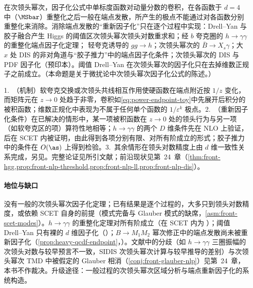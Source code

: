 \begin{proposition}\label{prop:power-nlp-endpoint}
在次领头幂次，因子化公式中单标度函数对动量分数的卷积，在各函数于 $d=4$ 中（$\MSbar$）重整化之后一般在端点发散，所产生的极点不能通过对各函数分别重整化来消除。消除端点发散的“重新因子化”只在逐个过程中实现：Drell--Yan 与胶子融合产生 Higgs 的阈值区次领头幂次领头对数重求和\cite{Beneke:2018gvs,Beneke:2019mua}；经 $b$ 夸克圈的 $h\to\gamma\gamma$ 的重整化端点因子化定理\cite{Liu:2019oav,Liu:2020wbn}；%
轻夸克诱导的 $gg\to h$\cite{Liu:2022ajh}；次领头幂次的 $\bar B\to X_s\gamma$\cite{Hurth:2023paz}；大 $x$ 处 DIS 的非对角道\cite{Beneke:2020ibj}与“胶子推力”中的端点因子化条件\cite{Beneke:2022obx}；次领头幂次的 DIS 与 PDF 因子化\cite{Beneke:2026miy}（预印本）。阈值 Drell--Yan 在次领头幂次的因子化只在去掉维数正规子之前成立\cite{Beneke:2019oqx}。（本命题是关于微扰论中次领头幂次因子化公式的陈述。）
\end{proposition}

\begin{proofsketch}
1.~（机制）软夸克交换或次领头共线相互作用使硬函数在端点附近按 $1/z$ 变化，而矩阵元在 $z\to0$ 处趋于非零，卷积如\eqref{eq:power-endpoint-toy}中先展开后积分的被积函数；维数正规化中表现为不属于任何单个函数的 $1/\varepsilon^k$ 极点\cite{Liu:2019oav,Beneke:2019oqx}。2.~（重新因子化条件）在已解决的情形中，某一项被积函数在 $z\to0$ 处的领头行为与另一项（如软夸克区的项）算符性地相等；$h\to\gamma\gamma$ 的两个 $D$ 维条件先在 NLO 上验证\cite{Liu:2019oav}，后在 SCET 内被证明，由此得到各项分别有限、对所有阶成立的形式\cite[第~3~节]{Liu:2020wbn}；胶子推力中的条件在 $O(\as)$ 上得到检验\cite{Beneke:2022obx}。3.~其余情形在领头对数精度上由 $d$ 维一致性关系完成\cite{Beneke:2018gvs,Beneke:2019mua,Beneke:2020ibj}，另见\cite{Hurth:2023paz,Beneke:2026miy}。完整论证见所引文献；前沿现状见第~24~章（\cref{thm:front-hgg,prop:front-nlp-threshold,prop:front-nlp-ll,prop:front-nlp-dis}）。
\end{proofsketch}

\paragraph{地位与缺口}
没有一般的次领头幂次因子化定理；已有结果是逐个过程的，大多只到领头对数精度，或依赖 SCET 自身的前提（模式完备与 Glauber 模式的缺席，\cref{asm:front-scet-modes}）。$h\to\gamma\gamma$ 的重整化定理对所有阶成立（在 SCET 内为 \tagA）；阈值 Drell--Yan 只有裸的 $d$ 维因子化（\tagP）；$B\to M_1M_2$ 幂次修正中的端点发散尚未被重新因子化（\cref{prop:heavy-qcdf-endpoint}，\tagV）。文献中的分歧（如 $h\to\gamma\gamma$ 三圈振幅的次领头对数与较早预言不一致\cite{Liu:2020wbn,Akhoury:2001mz}，SIDIS 次领头幂次计算与较早推导的差别\cite{Rodini:2023plb}）与次领头幂次 TMD 中被假定的 Glauber 相消（\cref{conj:front-glauber-nlp}）见第~24~章，本书不作裁决。升级途径：一般过程的次领头幂次区域分析与端点重新因子化的系统构造。
